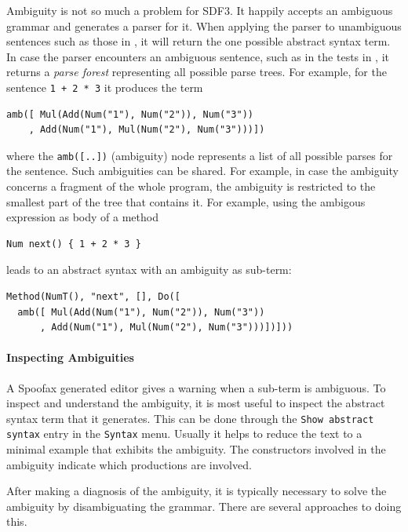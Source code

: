 Ambiguity is not so much a problem for SDF3. It happily accepts an ambiguous
grammar and generates a parser for it. When applying the parser to unambiguous
sentences such as those in , it will return the one
possible abstract syntax term. In case the parser encounters an ambiguous
sentence, such as in the tests in , it returns a
\emph{parse forest} representing all possible parse trees. For example, for the
sentence \texttt{1 + 2 * 3} it produces the term

\begin{lstlisting}[language=aterm]
amb([ Mul(Add(Num("1"), Num("2")), Num("3"))
    , Add(Num("1"), Mul(Num("2"), Num("3")))])
\end{lstlisting}

where the \texttt{amb([..])} (ambiguity) node represents a list of all possible
parses for the sentence. Such ambiguities can be shared. For example, in case
the ambiguity concerns a fragment of the whole program, the ambiguity is
restricted to the smallest part of the tree that contains it. For example,
using the ambigous expression as body of a method

\begin{lstlisting}[language=paplj]
Num next() { 1 + 2 * 3 }
\end{lstlisting}

leads to an abstract syntax with an ambiguity as sub-term:

\begin{lstlisting}[language=aterm]
Method(NumT(), "next", [], Do([
  amb([ Mul(Add(Num("1"), Num("2")), Num("3"))
      , Add(Num("1"), Mul(Num("2"), Num("3")))])]))
\end{lstlisting}

\paragraph{Inspecting Ambiguities}

A Spoofax generated editor gives a warning when a sub-term is ambiguous. To
inspect and understand the ambiguity, it is most useful to inspect the abstract
syntax term that it generates. This can be done through the \texttt{Show
abstract syntax} entry in the \texttt{Syntax} menu. Usually it helps to reduce
the text to a minimal example that exhibits the ambiguity. The constructors
involved in the ambiguity indicate which productions are involved.

After making a diagnosis of the ambiguity, it is typically necessary to solve
the ambiguity by disambiguating the grammar. There are several approaches to
doing this.

